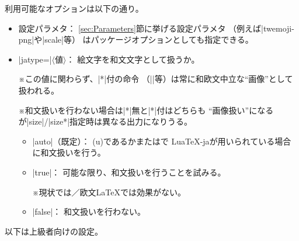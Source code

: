 \documentclass[a4paper]{ltjsarticle}
\renewcommand{\headfont}{\romanseries{sbc}\sffamily}
\newcommand{\Pkg}[1]{\textsf{#1}}
\newcommand{\Meta}[1]{$\langle$\mbox{}#1\mbox{}$\rangle$}
\newcommand{\Note}{\par\noindent ※}
\newcommand{\Means}{：\quad}
\newcommand{\／}{\mbox{}／\mbox{}}
\providecommand{\Strong}[1]{{\headfont#1}}
\begin{document}
利用可能なオプションは以下の通り。

\begin{itemize}
\item \Strong{設定パラメタ}\Means
  \ref{sec:Parameters}節に挙げる設定パラメタ
  （例えば|twemoji-png|や|scale|等）
  はパッケージオプションとしても指定できる。

\item |jatype=|\Meta{値}\Means
  絵文字を和文文字として扱うか。
  \Note この値に関わらず、|*|付の命令
  （||等）は常に和欧文中立な“画像”として扱われる。
  \Note 和文扱いを行わない場合は|*|無と|*|付はどちらも
  “画像扱い”になるが|size|/|size*|指定時は異なる出力になりうる。
  \begin{itemize}
  \item |auto|（既定）\Means
    (u){\pLaTeX}であるかまたは{\LuaLaTeX}で
    \Pkg{LuaTeX-ja}が用いられている場合に和文扱いを行う。
  \item |true|\Means
    可能な限り、和文扱いを行うことを試みる。
    \Note 現状では{\pdfLaTeX}\／{}欧文{\LaTeX}では効果がない。
  \item |false|\Means
    和文扱いを行わない。
  \end{itemize}
\end{itemize}

以下は上級者向けの設定。
\end{document}
